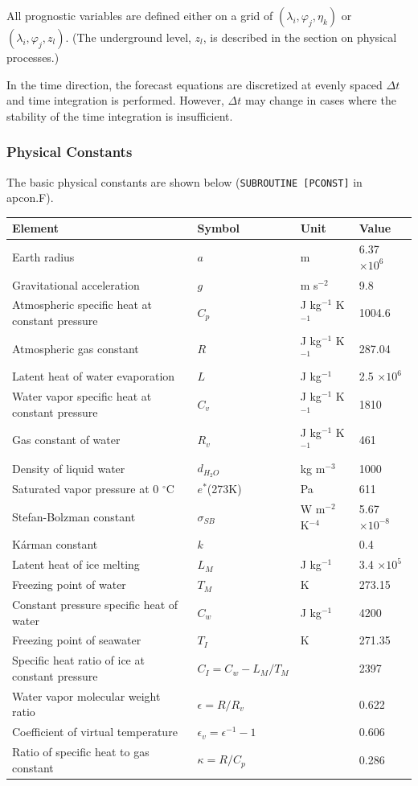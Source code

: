 All prognostic variables are defined either on a grid of
\((\lambda_i, \varphi_j, \eta_k)\) or \((\lambda_i, \varphi_j, z_l)\).
(The underground level, \(z_l\), is described in the section on physical
processes.)

In the time direction, the forecast equations are discretized at
evenly spaced \(\Delta t\) and time integration is performed.
However, \(\Delta t\) may change in cases where the stability of the time integration is insufficient.

\hypertarget{physical-constants}{%
\subsubsection{Physical Constants}\label{physical-constants}}

The basic physical constants are shown below
(\texttt{SUBROUTINE\ {[}PCONST{]}} in apcon.F).

\setlength\LTleft{0pt}\setlength\LTright{0pt}
\begin{longtable}[]{@{}llll@{}}
\toprule\relax
Element & Symbol & Unit & Value\tabularnewline
\midrule\relax
\endhead
Earth radius & \(a\) & m & 6.37 \(\times 10^6\)\tabularnewline
Gravitational acceleration & \(g\) & m s\(^{-2}\) & 9.8\tabularnewline
Atmospheric specific heat at constant pressure & \(C_p\) & J kg\(^{-1}\)
K\(^{-1}\) & 1004.6\tabularnewline
Atmospheric gas constant & \(R\) & J kg\(^{-1}\) K\(^{-1}\) &
287.04\tabularnewline
Latent heat of water evaporation & \(L\) & J kg\(^{-1}\) & 2.5
\(\times 10^6\)\tabularnewline
Water vapor specific heat at constant pressure & \(C_v\) & J kg\(^{-1}\)
K\(^{-1}\) & 1810\tabularnewline
Gas constant of water & \(R_v\) & J kg\(^{-1}\) K\(^{-1}\) &
461\tabularnewline
Density of liquid water & \(d_{H_2O}\) & kg m\(^{-3}\) &
1000\tabularnewline
Saturated vapor pressure at 0 \(^{\circ}\)C & \(e^*\)(273K) & Pa &
611\tabularnewline
Stefan-Bolzman constant & \(\sigma_{SB}\) & W m\(^{-2}\) K\(^{-4}\) &
5.67 \(\times 10^{-8}\)\tabularnewline
Kárman constant & \(k\) & & 0.4\tabularnewline
Latent heat of ice melting & \(L_M\) & J kg\(^{-1}\) & 3.4
\(\times 10^5\)\tabularnewline
Freezing point of water & \(T_M\) & K & 273.15\tabularnewline
Constant pressure specific heat of water & \(C_w\) & J kg\(^{-1}\) &
4200\tabularnewline
Freezing point of seawater & \(T_I\) & K & 271.35\tabularnewline
Specific heat ratio of ice at constant pressure &
\(C_I = C_w - L_M/T_M\) & & 2397\tabularnewline
Water vapor molecular weight ratio & \(\epsilon = R/R_v\) & &
0.622\tabularnewline
Coefficient of virtual temperature & \(\epsilon_v = \epsilon^{-1} - 1\)
& & 0.606\tabularnewline
Ratio of specific heat to gas constant & \(\kappa = R/C_p\) & &
0.286\tabularnewline
\bottomrule
\end{longtable}
